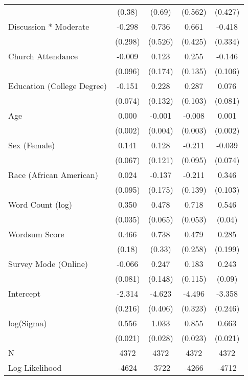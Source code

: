 \begin{table}[ht]
\begin{tabular}{lcccc}
   & (0.38) & (0.69) & (0.562) & (0.427) \\ 
  Discussion * Moderate & -0.298 &  0.736 &  0.661 & -0.418 \\ 
   & (0.298) & (0.526) & (0.425) & (0.334) \\ 
  Church Attendance & -0.009 &  0.123 &  0.255 & -0.146 \\ 
   & (0.096) & (0.174) & (0.135) & (0.106) \\ 
  Education (College Degree) & -0.151 &  0.228 &  0.287 &  0.076 \\ 
   & (0.074) & (0.132) & (0.103) & (0.081) \\ 
  Age &  0.000 & -0.001 & -0.008 &  0.001 \\ 
   & (0.002) & (0.004) & (0.003) & (0.002) \\ 
  Sex (Female) &  0.141 &  0.128 & -0.211 & -0.039 \\ 
   & (0.067) & (0.121) & (0.095) & (0.074) \\ 
  Race (African American) &  0.024 & -0.137 & -0.211 &  0.346 \\ 
   & (0.095) & (0.175) & (0.139) & (0.103) \\ 
  Word Count (log) &  0.350 &  0.478 &  0.718 &  0.546 \\ 
   & (0.035) & (0.065) & (0.053) & (0.04) \\ 
  Wordsum Score &  0.466 &  0.738 &  0.479 &  0.285 \\ 
   & (0.18) & (0.33) & (0.258) & (0.199) \\ 
  Survey Mode (Online) & -0.066 &  0.247 &  0.183 &  0.243 \\ 
   & (0.081) & (0.148) & (0.115) & (0.09) \\ 
  Intercept & -2.314 & -4.623 & -4.496 & -3.358 \\ 
   & (0.216) & (0.406) & (0.323) & (0.246) \\ 
  log(Sigma) &  0.556 &  1.033 &  0.855 &  0.663 \\ 
   & (0.021) & (0.028) & (0.023) & (0.021) \\ 
   \hline
N & 4372 & 4372 & 4372 & 4372 \\ 
  Log-Likelihood & -4624 & -3722 & -4266 & -4712 \\ 
   \hline
\end{tabular}
\endgroup
\end{table}
